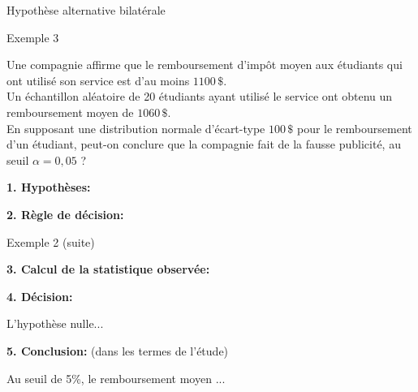 \documentclass{BeamerTemplate}
\begin{document}
\begin{frame}[t]{Hypothèse alternative bilatérale}
\begin{minipage}{0.48\textwidth}
\end{minipage}
    
\end{frame}

\begin{frame}[t]{Exemple 3}

{\small
Une compagnie affirme que le remboursement d'imp\^ot moyen aux étudiants qui ont utilisé
son service est d'au moins $1100 \,\$$. \\
Un échantillon aléatoire de 20 étudiants ayant utilisé le service ont obtenu un  remboursement moyen de $1060 \,\$$. \\
En supposant une distribution normale d'écart-type $100 \,\$$ pour le remboursement d'un étudiant, peut-on conclure que la compagnie fait de la fausse publicité, au seuil $\alpha = 0,05$ ?}\\

\bigskip

{\bf 1. Hypothèses:}
\bigskip

{\bf 2. Règle de décision:}

\end{frame}

\begin{frame}[t]{Exemple 2 (suite)}

{\bf 3. Calcul de la statistique observée:}

\vfill
{\bf 4. Décision:}

L'hypothèse nulle...

\bigskip
{\bf 5. Conclusion:} (dans les termes de l'étude)

Au seuil de 5\%, le remboursement moyen ...
\bigskip
\end{frame}
\end{document}
